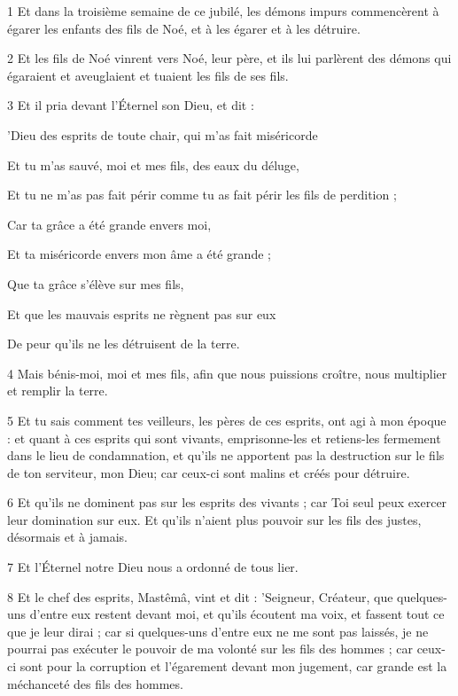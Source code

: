 \par 1 Et dans la troisième semaine de ce jubilé, les démons impurs commencèrent à égarer les enfants des fils de Noé, et à les égarer et à les détruire.
\par 2 Et les fils de Noé vinrent vers Noé, leur père, et ils lui parlèrent des démons qui égaraient et aveuglaient et tuaient les fils de ses fils.
\par 3 Et il pria devant l'Éternel son Dieu, et dit :
\par    
\par     'Dieu des esprits de toute chair, qui m'as fait miséricorde  
\par     Et tu m'as sauvé, moi et mes fils, des eaux du déluge,  
\par     Et tu ne m’as pas fait périr comme tu as fait périr les fils de perdition ;
\par    
\par     Car ta grâce a été grande envers moi,  
\par     Et ta miséricorde envers mon âme a été grande ;
\par    
\par     Que ta grâce s'élève sur mes fils,  
\par     Et que les mauvais esprits ne règnent pas sur eux  
\par     De peur qu’ils ne les détruisent de la terre.
\par    
\par 4 Mais bénis-moi, moi et mes fils, afin que nous puissions croître, nous multiplier et remplir la terre.
\par 5 Et tu sais comment tes veilleurs, les pères de ces esprits, ont agi à mon époque : et quant à ces esprits qui sont vivants, emprisonne-les et retiens-les fermement dans le lieu de condamnation, et qu'ils ne apportent pas la destruction sur le fils de ton serviteur, mon Dieu; car ceux-ci sont malins et créés pour détruire.
\par 6 Et qu'ils ne dominent pas sur les esprits des vivants ; car Toi seul peux exercer leur domination sur eux. Et qu'ils n'aient plus pouvoir sur les fils des justes, désormais et à jamais.
\par 7 Et l'Éternel notre Dieu nous a ordonné de tous lier.
\par 8 Et le chef des esprits, Mastêmâ, vint et dit : 'Seigneur, Créateur, que quelques-uns d'entre eux restent devant moi, et qu'ils écoutent ma voix, et fassent tout ce que je leur dirai ; car si quelques-uns d’entre eux ne me sont pas laissés, je ne pourrai pas exécuter le pouvoir de ma volonté sur les fils des hommes ; car ceux-ci sont pour la corruption et l'égarement devant mon jugement, car grande est la méchanceté des fils des hommes.
